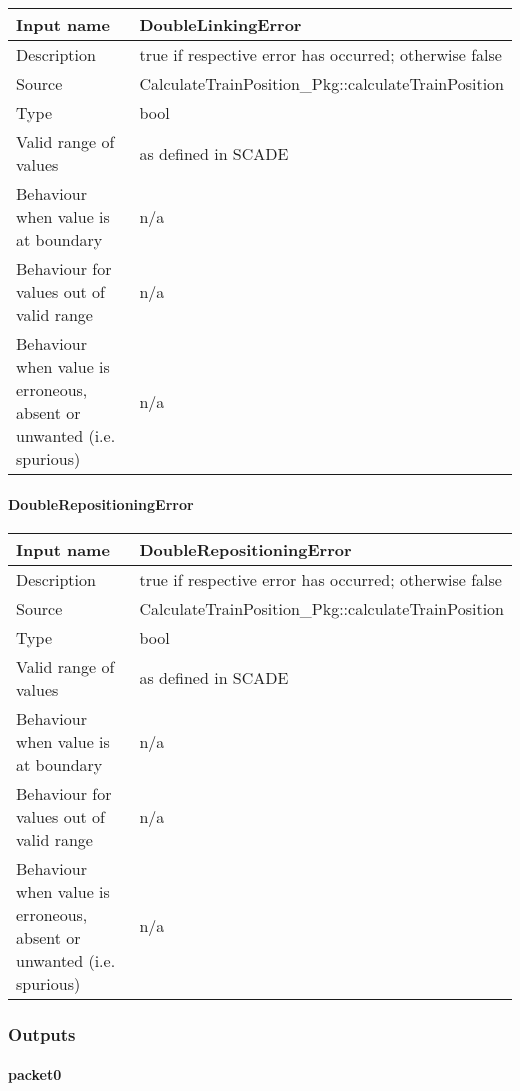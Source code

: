 \begin{longtable}{p{}p{}}
\toprule
Input name				& DoubleLinkingError \\
\midrule
Description				& true if respective error has occurred; otherwise false \\
\midrule
Source					& CalculateTrainPosition\_Pkg::calculateTrainPosition \\ 
\midrule
Type					& bool \\
\midrule
Valid range of values	& as defined in SCADE \\
\midrule
Behaviour when value is at boundary	& n/a \\
\midrule
Behaviour for values out of valid range	& n/a \\
\midrule
Behaviour when value is erroneous, absent or unwanted (i.e. spurious) & n/a \\
\bottomrule
\end{longtable}

\paragraph{DoubleRepositioningError}

\begin{longtable}{p{}p{}}
\toprule
Input name				& DoubleRepositioningError \\
\midrule
Description				& true if respective error has occurred; otherwise false \\
\midrule
Source					& CalculateTrainPosition\_Pkg::calculateTrainPosition \\ 
\midrule
Type					& bool \\
\midrule
Valid range of values	& as defined in SCADE \\
\midrule
Behaviour when value is at boundary	& n/a \\
\midrule
Behaviour for values out of valid range	& n/a \\
\midrule
Behaviour when value is erroneous, absent or unwanted (i.e. spurious) & n/a \\
\bottomrule
\end{longtable}


\subsubsection{Outputs}\label{s:provide_position_report_outputs}

\paragraph{packet0}

